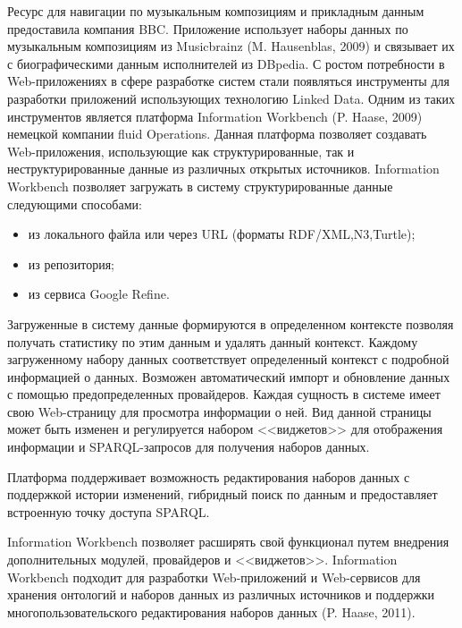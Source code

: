 Ресурс для навигации по музыкальным композициям и прикладным данным предоставила компания BBC. Приложение использует наборы данных по музыкальным композициям из Musicbrainz (M. Hausenblas, 2009) и связывает их с биографическими данным исполнителей из  DBpedia. 
С ростом потребности в Web-приложениях в сфере разработке систем стали появляться инструменты для разработки приложений использующих технологию Linked Data. Одним из таких инструментов является платформа Information Workbench (P. Haase, 2009)  немецкой компании fluid Operations. Данная платформа позволяет создавать Web-приложения, использующие как структурированные, так и неструктурированные данные из различных открытых источников. Information Workbench позволяет загружать в систему структурированные данные следующими способами:

\begin{itemize}
\item из локального файла или через URL (форматы RDF/XML,N3,Turtle);
\item из репозитория;
\item из сервиса Google Refine.
\end{itemize}

Загруженные в систему данные формируются в определенном контексте позволяя получать статистику по этим данным и удалять данный контекст. Каждому загруженному набору данных соответствует определенный контекст с подробной информацией о данных. Возможен автоматический импорт и обновление данных с помощью предопределенных провайдеров.
Каждая сущность в системе имеет свою Web-страницу для просмотра информации о ней. Вид данной страницы может быть изменен и регулируется набором <<виджетов>> для отображения информации и SPARQL-запросов для получения наборов данных.

Платформа поддерживает возможность редактирования наборов данных с поддержкой истории изменений, гибридный поиск по данным и предоставляет встроенную точку доступа SPARQL. 

Information Workbench позволяет расширять свой функционал путем внедрения дополнительных  модулей, провайдеров и <<виджетов>>. Information Workbench подходит для разработки Web-приложений и Web-сервисов для хранения онтологий и наборов данных из различных источников и поддержки многопользовательского редактирования наборов данных (P. Haase, 2011). 


\clearpage
